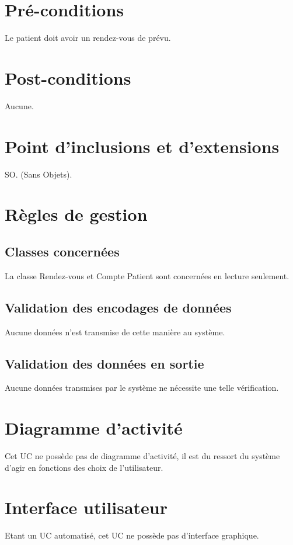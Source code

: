 \section{Pré-conditions}

Le patient doit avoir un rendez-vous de prévu.

\section{Post-conditions}

Aucune.

\section{Point d'inclusions et d'extensions}

SO. (Sans Objets).
\section{Règles de gestion}

\subsection{Classes concernées}

La classe Rendez-vous et Compte Patient sont concernées en lecture seulement.

\subsection{Validation des encodages de données}

Aucune données n'est transmise de cette manière au système.

\subsection{Validation des données en sortie}

Aucune données transmises par le système ne nécessite une telle vérification.

\section{Diagramme d'activité}

Cet UC ne possède pas de diagramme d'activité, il est du ressort du système d'agir en fonctions
des choix de l'utilisateur.

\section{Interface utilisateur}

Etant un UC automatisé, cet UC ne possède pas d'interface graphique.


